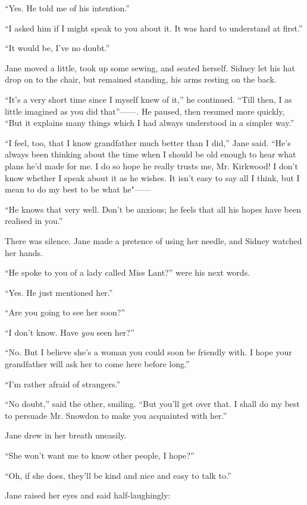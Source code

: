 ``Yes. He told me of his intention.''

``I asked him if I might speak to you about it. It was hard to
understand at first.''

``It would be, I've no doubt.''

Jane moved a little, took up some sewing, {}and seated herself. Sidney
let his hat drop on to the chair, but remained standing, his arms
resting on the back.

``It's a very short time since I myself knew of it,'' he continued.
``Till then, I as little imagined as you did {that''{{------}}.} He
paused, then resumed more quickly, ``But it explains many things which I
had always understood in a simpler way.''

``I feel, too, that I know grandfather much better than I did,'' Jane
said. ``He's always been thinking about the time when I should be old
enough to hear what plans he'd made for me. I do so hope he really
trusts me, Mr. Kirkwood! I don't know whether I speak about it as he
wishes. It isn't easy to say all I think, but I mean to do my best to be
what {he"{{------}}}

``He knows that very well. Don't be anxious; he feels that all his hopes
have been realised in you.''

There was silence. Jane made a pretence of using her needle, and Sidney
watched her hands.

{}``He spoke to you of a lady called Miss Lant?'' were his next words.

``Yes. He just mentioned her.''

``Are you going to see her soon?''

``I don't know. Have \emph{you} seen her?''

``No. But I believe she's a woman you could soon be friendly with. I
hope your grandfather will ask her to come here before long.''

``I'm rather afraid of strangers.''

``No doubt,'' said the other, smiling. ``But you'll get over that. I
shall do my best to persuade Mr. Snowdon to make you acquainted with
her.''

Jane drew in her breath uneasily.

``She won't want me to know other people, I hope?''

``Oh, if she does, they'll be kind and nice and easy to talk to.''

Jane raised her eyes and said half-laughingly:

